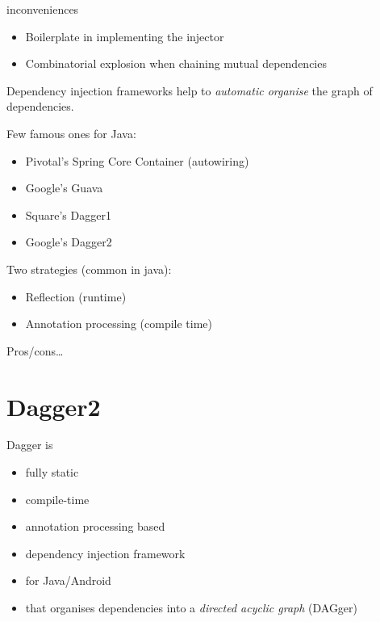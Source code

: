 \documentclass[10pt]{beamer}
\begin{document}
\begin{frame}[fragile]
	\begin{alertblock}{inconveniences}
		\begin{itemize}
			\item Boilerplate in implementing the injector 
			\item 
		Combinatorial explosion when chaining mutual dependencies
		\end{itemize}
	\end{alertblock}
\end{frame}

\begin{frame}
	Dependency injection frameworks help to \emph{automatic organise} the graph of dependencies. 

	Few famous ones for Java:
	\begin{itemize}
		\item Pivotal's Spring Core Container (autowiring) 
		\item Google's Guava 
		\item Square's Dagger1
		\item Google's Dagger2
	\end{itemize}
\end{frame}

\begin{frame}
	Two strategies (common in java):
	\begin{itemize}
		\item Reflection (runtime) 
		\item Annotation processing (compile time)
	\end{itemize}

	Pros/cons\ldots 
\end{frame}

	\section{Dagger2}
	\begin{frame}
		Dagger is
		\begin{itemize}
			\item fully static 
			\item compile-time 
			\item annotation processing based 
			\item dependency injection framework
			\item for Java/Android
			\item that organises dependencies into a \emph{directed acyclic graph
				}	(DAGger)
		\end{itemize}
	\end{frame}
\end{document}
